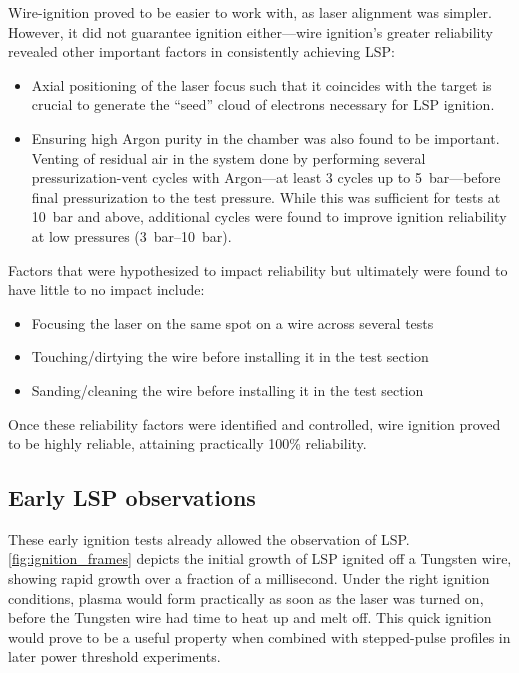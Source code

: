             Wire-ignition proved to be easier to work with, as laser alignment was simpler. However, it did not guarantee ignition either---wire ignition's greater reliability revealed other important factors in consistently achieving LSP:
            \begin{itemize}
                \item Axial positioning of the laser focus such that it coincides with the target is crucial to generate the ``seed'' cloud of electrons necessary for LSP ignition.
                \item Ensuring high Argon purity in the chamber was also found to be important. Venting of residual air in the system done by performing several pressurization-vent cycles with Argon---at least 3 cycles up to \qty{5}{bar}---before final pressurization to the test pressure. While this was sufficient for tests at \qty{10}{bar} and above, additional cycles were found to improve ignition reliability at low pressures (\qtyrange{3}{10}{bar}).
            \end{itemize}
            Factors that were hypothesized to impact reliability but ultimately were found to have little to no impact include:
            \begin{itemize}
                \item Focusing the laser on the same spot on a wire across several tests
                \item Touching/dirtying the wire before installing it in the test section
                \item Sanding/cleaning the wire before installing it in the test section
            \end{itemize}
            Once these reliability factors were identified and controlled, wire ignition proved to be highly reliable, attaining practically 100\% reliability. 

        \subsection{Early LSP observations}
            These early ignition tests already allowed the observation of LSP. \autoref{fig:ignition_frames} depicts the initial growth of LSP ignited off a Tungsten wire, showing rapid growth over a fraction of a millisecond. Under the right ignition conditions, plasma would form practically as soon as the laser was turned on, before the Tungsten wire had time to heat up and melt off. This quick ignition would prove to be a useful property when combined with stepped-pulse profiles in later power threshold experiments.


